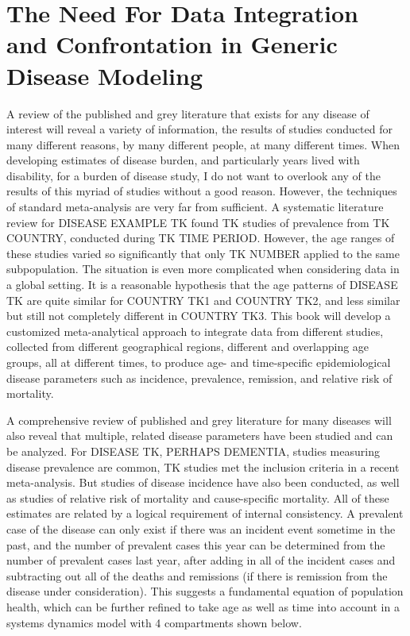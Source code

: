 \section{The Need For Data Integration and Confrontation in Generic Disease Modeling}

A review of the published and grey literature that exists for any
disease of interest will reveal a variety of information, the results
of studies conducted for many different reasons, by many different
people, at many different times. When developing estimates of disease
burden, and particularly years lived with disability, for a burden of
disease study, I do not want to overlook any of the results of this
myriad of studies without a good reason. However, the techniques of
standard meta-analysis are very far from sufficient. A systematic
literature review for DISEASE EXAMPLE TK found TK studies of
prevalence from TK COUNTRY, conducted during TK TIME PERIOD.  However,
the age ranges of these studies varied so significantly that only TK
NUMBER applied to the same subpopulation.  The situation is even more
complicated when considering data in a global setting. It is a
reasonable hypothesis that the age patterns of DISEASE TK are quite
similar for COUNTRY TK1 and COUNTRY TK2, and less similar but still
not completely different in COUNTRY TK3. This book will develop a
customized meta-analytical approach to integrate data from different
studies, collected from different geographical regions, different and
overlapping age groups, all at different times, to produce age- and
time-specific epidemiological disease parameters such as incidence,
prevalence, remission, and relative risk of mortality.

A comprehensive review of published and grey literature for many
diseases will also reveal that multiple, related disease parameters
have been studied and can be analyzed. For DISEASE TK, PERHAPS
DEMENTIA, studies measuring disease prevalence are common, TK studies
met the inclusion criteria in a recent meta-analysis. But studies of
disease incidence have also been conducted, as well as studies of
relative risk of mortality and cause-specific mortality. All of these
estimates are related by a logical requirement of internal
consistency.  A prevalent case of the disease can only exist if there
was an incident event sometime in the past, and the number of
prevalent cases this year can be determined from the number of
prevalent cases last year, after adding in all of the incident cases
and subtracting out all of the deaths and remissions (if there is
remission from the disease under consideration).  This suggests a
fundamental equation of population health, which can be further
refined to take age as well as time into account in a systems dynamics
model with 4 compartments shown below.

